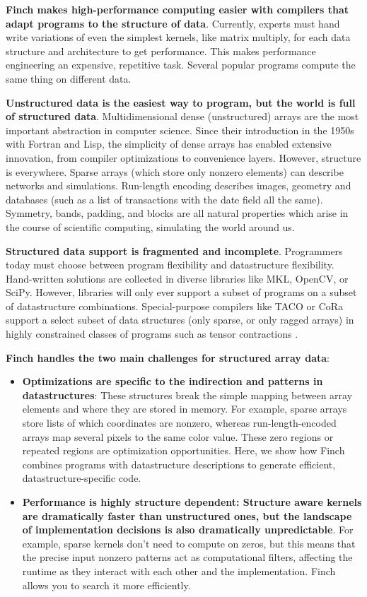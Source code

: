 \documentclass[acmsmall]{acmart}
\begin{document}
\textbf{Finch makes high-performance computing easier with compilers that adapt programs to the structure of data}.  Currently, experts must hand write variations of even the simplest kernels, like matrix multiply, for each data structure and architecture to get performance. This makes performance engineering an expensive, repetitive task. Several popular programs compute the same thing on different data. 

\textbf{Unstructured data is the easiest way to program, but the world is full of structured data}. Multidimensional dense (unstructured) arrays are the most important abstraction in computer science. Since their introduction in the 1950s with Fortran and Lisp, the simplicity of dense arrays has enabled extensive innovation, from compiler optimizations to convenience layers. However, structure is everywhere. Sparse arrays (which store only nonzero elements) can describe networks and simulations. Run-length encoding describes images, geometry and databases (such as a list of transactions with the date field all the same). Symmetry, bands, padding, and blocks are all natural properties which arise in the course of scientific computing, simulating the world around us.

\textbf{Structured data support is fragmented and incomplete}. Programmers today must choose between program flexibility and datastructure flexibility. Hand-written solutions are collected in diverse libraries like MKL, OpenCV, or SciPy. However, libraries will only ever support a subset of programs on a subset of datastructure combinations. Special-purpose compilers like TACO or CoRa support a select subset of data structures (only sparse, or only ragged arrays) in highly constrained classes of programs such as tensor contractions \cite{kjolstad_tensor_2019, fegade_cora_2022}.

\textbf{Finch handles the two main challenges for structured array data}:
\begin{itemize}
\item \textbf{Optimizations are specific to the indirection and patterns in datastructures}: These structures break the simple mapping between array elements and where they are stored in memory. For example, sparse arrays store lists of which coordinates are nonzero, whereas run-length-encoded arrays map several pixels to the same color value. These zero regions or repeated regions are optimization opportunities. Here, we show how Finch combines programs with datastructure descriptions to generate efficient, datastructure-specific code. 

\item \textbf{Performance is highly structure dependent: Structure aware kernels are dramatically faster than unstructured ones, but the landscape of implementation decisions is also dramatically unpredictable}. For example, sparse kernels don’t need to compute on zeros, but this means that the precise input nonzero patterns act as computational filters, affecting the runtime as they interact with each other and the implementation. Finch allows you to search it more efficiently.
\end{itemize}
\end{document}

